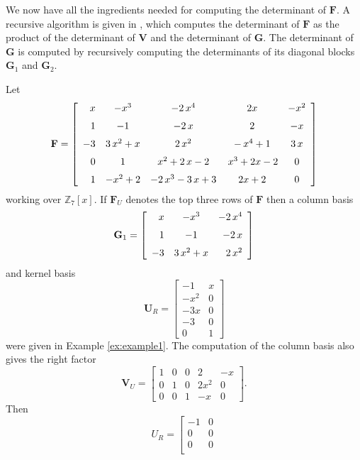 We now have all the ingredients needed for computing the determinant
of $\mathbf{F}$. A recursive algorithm is given in ,
which computes the determinant of $\mathbf{F}$ as the product of
the determinant of $\mathbf{V}$ and the determinant of $\mathbf{G}$.
The determinant of $\mathbf{G}$ is computed by recursively computing
the determinants of its diagonal blocks $\mathbf{G}_{1}$ and $\mathbf{G}_{2}$.


\begin{example}
Let 
\[
\mathbf{F}=\left[\begin{array}{rcccc}
x & -{x}^{3} & -2\,{x}^{4} & 2x & -{x}^{2}\\
\noalign{\medskip}1 & -1 & -2\, x & 2 & -x\\
\noalign{\medskip}-3 & 3\,{x}^{2}+x & 2\,{x}^{2} & -\,{x}^{4}+1 & 3\, x\\
\noalign{\medskip}0 & 1 & {x}^{2}+2\, x-2 & \,{x}^{3}+2x-2 & 0\\
\noalign{\medskip}1 & -{x}^{2}+2 & -2\,{x}^{3}-3\, x+3 & 2x+2 & 0
\end{array}\right]
\]
 working over $\mathbb{Z}_{7}[x]$. If $\mathbf{F}_{U}$ denotes the
top three rows of $\mathbf{F}$ then a column basis 
\[
\mathbf{G}_{1}=\left[\begin{array}{rcr}
x & -{x}^{3} & -2\,{x}^{4}\\
\noalign{\medskip}1 & -1 & -2\, x\\
\noalign{\medskip}-3 & 3\,{x}^{2}+x & 2\,{x}^{2}
\end{array}\right]
\]
 and kernel basis 
\[
\mathbf{U}_{R}=\left[\begin{array}{rc}
-1 & x\\
-x^{2} & 0\\
-3x & 0\\
-3 & 0\\
0 & 1
\end{array}\right]
\]
 were given in Example \ref{ex:example1}. The computation of the
column basis also gives the right factor 
\[
\mathbf{V}_{U}=\left[\begin{array}{cccrr}
1 & 0 & 0 & 2 & -x\\
0 & 1 & 0 & 2x^{2} & 0\\
0 & 0 & 1 & -x & 0
\end{array}\right].
\]
Then 
\[
{U}_{R}=\left[\begin{array}{rc}
-1 & 0\\
0 & 0\\
0 & 0\\

\end{array}\]
\end{example}
